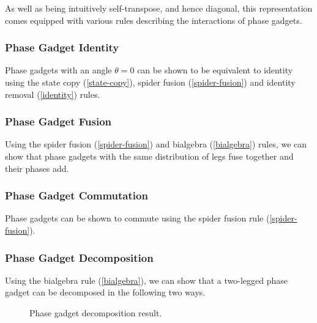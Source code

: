 As well as being intuitively self-transpose, and hence diagonal, this representation comes equipped with various rules describing the interactions of phase gadgets. 


\subsubsection{Phase Gadget Identity}%
\label{phase-gadget-identity}

Phase gadgets with an angle $\theta = 0$ can be shown to be equivalent to identity using the state copy (\ref{state-copy}), spider fusion (\ref{spider-fusion}) and identity removal (\ref{identity}) rules.



\subsubsection{Phase Gadget Fusion}%
\label{phase-gadget-fusion}
Using the spider fusion (\ref{spider-fusion}) and bialgebra (\ref{bialgebra}) rules, we can show that phase gadgets with the same distribution of legs fuse together and their phases add.



\subsubsection{Phase Gadget Commutation}%
\label{phase-gadget-commutation}

Phase gadgets can be shown to commute using the spider fusion rule (\ref{spider-fusion}).



\subsubsection{Phase Gadget Decomposition}%

Using the bialgebra rule (\ref{bialgebra}), we can show that a two-legged phase gadget can be decomposed in the following two ways.

\begin{figure}[H]
    \centering
    \caption{Phase gadget decomposition result.}
    \label{phase-gadget-decomposition}
\end{figure}

